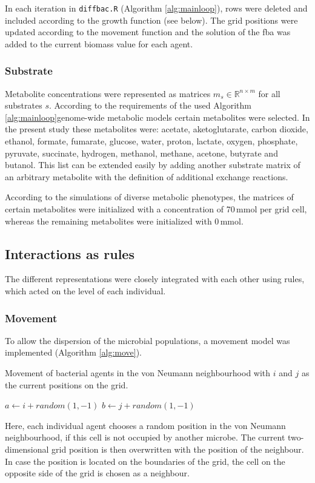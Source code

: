 In each iteration in \texttt{diffbac.R} (Algorithm \hyperref[alg:mainloop]{\ref{alg:mainloop}}), rows were deleted and included according to the growth function (see below). The grid positions were updated according to the movement function and the solution of the fba was added to the current biomass value for each agent.

\subsubsection{Substrate}
Metabolite concentrations were represented as matrices $m_s \in \mathbb{R}^{n \times m}$ for all substrates $s$. According to the requirements of the used Algorithm \hyperref[alg:mainloop]{\ref{alg:mainloop}}genome-wide metabolic models certain metabolites were selected. In the present study these metabolites were: acetate, aketoglutarate, carbon dioxide, ethanol, formate, fumarate, glucose, water, proton, lactate, oxygen, phosphate, pyruvate, succinate, hydrogen, methanol, methane, acetone, butyrate and butanol.
This list can be extended easily by adding another substrate matrix of an arbitrary metabolite with the definition of additional exchange reactions.

According to the simulations of diverse metabolic phenotypes, the matrices of certain metabolites were initialized with a concentration of 70\,mmol per grid cell, whereas the remaining metabolites were initialized with 0\,mmol. 

\subsection{Interactions as rules}
The different representations were closely integrated with each other using rules, which acted on the level of each individual.

\subsubsection{Movement}
To allow the dispersion of the microbial populations, a movement model was implemented (Algorithm \hyperref[alg:move]{\ref{alg:move}}). 
\begin{algorithm}
\caption{Movement of bacterial agents in the von Neumann neighbourhood with $i$ and $j$ as the current positions on the grid.}
\SetAlgoLined
$a \leftarrow i+random(1,-1)$\;
$b \leftarrow j+random(1,-1)$\;
\label{alg:move}
\end{algorithm}
Here, each individual agent chooses a random position in the von Neumann neighbourhood, if this cell is not occupied by another microbe. The current two-dimensional grid position is then overwritten with the position of the neighbour. In case the position is located on the boundaries of the grid, the cell on the opposite side of the grid is chosen as a neighbour.
